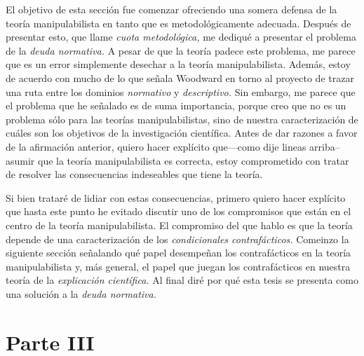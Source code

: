 El objetivo de esta sección fue comenzar ofreciendo una
somera defensa de la teoría manipulabilista en tanto que es
metodológicamente adecuada. Después de presentar esto, que
llame \emph{cuota metodológica,} me dediqué a presentar el
problema de la \emph{deuda normativa.} A pesar de que la
teoría padece este problema, me parece que es un error
simplemente desechar a la teoría manipulabilista. Además,
estoy de acuerdo con mucho de lo que señala Woodward en
torno al proyecto de trazar una ruta entre los dominios
\emph{normativo} y \emph{descriptivo.} Sin embargo, me
parece que el problema que he señalado es de suma
importancia, porque creo que no es un problema sólo para las
teorías manipulabilistas, sino de nuestra caracterización
de cuáles son los objetivos de la investigación científica.
Antes de dar razones a favor de la afirmación anterior,
quiero hacer explícito que---como dije lineas
arriba--asumir que la teoría manipulabilista es correcta,
estoy comprometido con tratar de resolver las consecuencias
indeseables que tiene la teoría. 

Si bien trataré de lidiar con estas consecuencias, primero
quiero hacer explícito que hasta este punto he evitado
discutir uno de los compromisos que están en el centro de la
teoría manipulabilista. El compromiso del que hablo es que
la teoría depende de una caracterización de los \emph{condicionales
contrafácticos.} Comeinzo la siguiente sección señalando
qué papel desempeñan los contrafácticos en la teoría
manipulabilista y, más general, el papel que juegan los
contrafácticos en nuestra teoría de la \emph{explicación
científica.} Al final diré por qué esta tesis se presenta
como una solución a la \emph{deuda normativa.}



\section*{Parte III}\label{piii}


